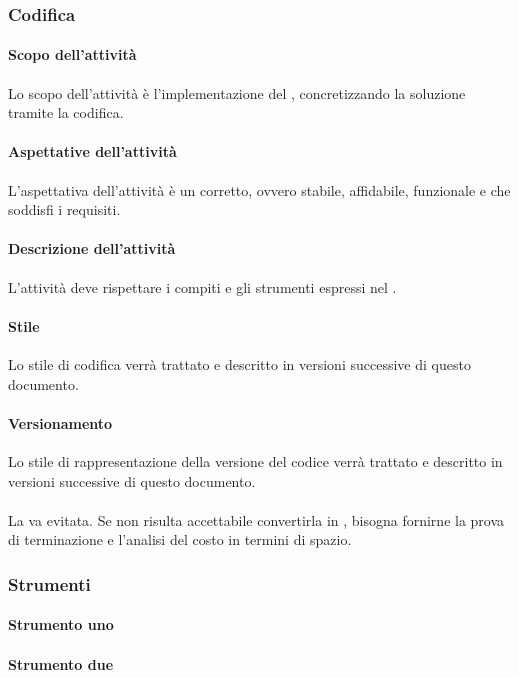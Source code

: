 \subsubsection{Codifica}
 \paragraph{Scopo dell'attività}
 Lo scopo dell'attività è l'implementazione del , concretizzando la soluzione tramite la codifica.  
 \paragraph{Aspettative dell'attività}
 L'aspettativa dell'attività è un  corretto, ovvero stabile, affidabile, funzionale e che soddisfi i requisiti. 
 \paragraph{Descrizione dell'attività}
 L'attività deve rispettare i compiti e gli strumenti espressi nel \PPdocRR.
 \paragraph{Stile}
 Lo stile di codifica verrà trattato e descritto in versioni successive di questo documento.
 \paragraph{Versionamento}
 Lo stile di rappresentazione della versione del codice verrà trattato e descritto in versioni successive di questo documento.
 \paragraph{}
 La  va evitata. Se non risulta accettabile convertirla in , bisogna fornirne la prova di terminazione e l'analisi del costo in termini di spazio.
\subsubsection{Strumenti}
  \paragraph{Strumento uno}

 \paragraph{Strumento due}



  

